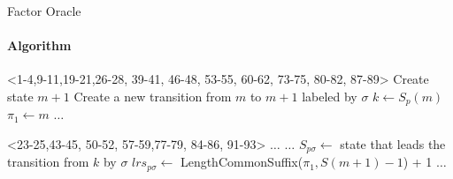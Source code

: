 \begin{frame}[fragile]{Factor Oracle}
  \framesubtitle{Algorithm}
  \vspace{-0.5cm}
  \begin{minipage}[t][4.5cm][t]{\textwidth}

  \begin{algorithm}[H]
    \caption{Incremental update of Factor Oracle}\label{alg:addletter}
    \begin{algorithmic}[1]

      \only<1-4,9-11,19-21,26-28, 39-41, 46-48, 53-55, 60-62, 73-75,
      80-82, 87-89>{%
        \State Create state $m+1$
        \State Create a new transition from $m$ to $m+1$ labeled by
        $\sigma$ 
        \State $k \gets S_{p}(m)$
        \State $\pi_{1} \gets m$
        \State $\dots$
      }




      \only<23-25,43-45, 50-52, 57-59,77-79,
      84-86, 91-93>{
        \State $\dots$
        \State $\dots$
        \Else
        \State $S_{p\sigma}\gets $ state that leads the transition
        from $k$ by $\sigma$
        \State $lrs_{p\sigma} \gets $ LengthCommonSuffix($\pi_{1},S(m+1)-1$) + 1
        \EndIf
        \State $\dots$
      }



      \EndFunction
    \end{algorithmic}
  \end{algorithm}
\end{minipage}


\end{frame}

